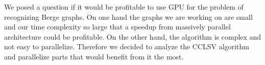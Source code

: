 We posed a question if it would be profitable to use GPU for the problem of recognizing Berge graphs. On one hand the graphs we are working on are small and our time complexity so large that a speedup from massively parallel architecture could be profitable. On the other hand, the algorithm is complex and not easy to parallelize. Therefore we decided to analyze the  CCLSV algorithm and parallelize parts that would benefit from it the most.






